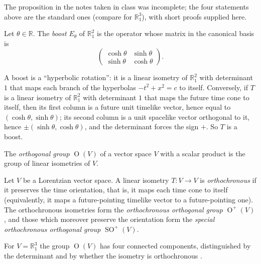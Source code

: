 The proposition in the notes taken in class
was incomplete; the four statements above
are the standard ones (compare
\cite[Section 1.1]{lopez2014differential}
for $\mathbb{R}^3_1$), with short proofs
supplied here.

\begin{definition}[Boost]
\label{definition-palmas-boost}
Let $\theta\in\mathbb{R}$. The
\emph{boost} $E_{\theta}$ of
$\mathbb{R}^2_1$ is the operator whose
matrix in the canonical basis is
$$
\begin{pmatrix}
\cosh\theta & \sinh\theta\\
\sinh\theta & \cosh\theta
\end{pmatrix}.
$$
\end{definition}

A boost is a ``hyperbolic rotation'': it
is a linear isometry of $\mathbb{R}^2_1$
with determinant $1$ that maps each branch
of the hyperbolas $-t^2+x^2=c$ to itself.
Conversely, if $T$ is a linear isometry of
$\mathbb{R}^2_1$ with determinant $1$ that
maps the future time cone to itself, then
its first column is a future unit timelike
vector, hence equal to
$(\cosh\theta,\sinh\theta)$; its second
column is a unit spacelike vector
orthogonal to it, hence
$\pm(\sinh\theta,\cosh\theta)$, and the
determinant forces the sign $+$. So $T$ is
a boost.

\begin{definition}
\label{definition-palmas-orthogonal-group}
The \emph{orthogonal group}
$\operatorname{O}(V)$ of a vector space
$V$ with a scalar product is the group of
linear isometries of $V$.
\end{definition}

\begin{definition}[Orthochronous]
\label{definition-palmas-orthochronous}
Let $V$ be a Lorentzian vector space. A
linear isometry $T\colon V\to V$ is
\emph{orthochronous} if it preserves the
time orientation, that is, it maps each
time cone to itself (equivalently, it maps
a future-pointing timelike vector to a
future-pointing one). The orthochronous
isometries form the \emph{orthochronous
orthogonal group} $\operatorname{O}^+(V)$,
and those which moreover preserve the
orientation form the \emph{special
orthochronous orthogonal group}
$\operatorname{SO}^+(V)$.
\end{definition}

For $V=\mathbb{R}^3_1$ the group
$\operatorname{O}(V)$ has four connected
components, distinguished by the
determinant and by whether the isometry is
orthochronous
\cite[Theorem 1.2]{lopez2014differential}.

